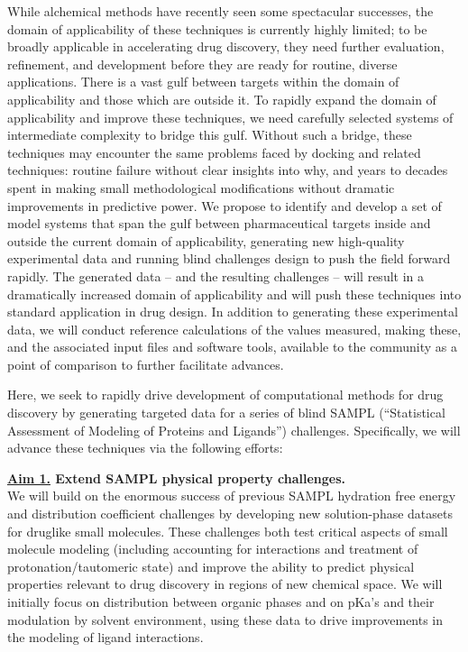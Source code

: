 \documentclass[11pt]{article}
\begin{document}
While alchemical methods have recently seen some spectacular successes, the domain of applicability of these techniques is currently highly limited; to be broadly applicable in accelerating drug discovery, they need further evaluation, refinement, and development before they are ready for routine, diverse applications. 
There is a vast gulf between targets within the domain of applicability and those which are outside it. 
To rapidly expand the domain of applicability and improve these techniques, we need carefully selected systems of intermediate complexity to bridge this gulf. 
Without such a bridge, these techniques may encounter the same problems faced by docking and related techniques: routine failure without clear insights into why, and years to decades spent in making small methodological modifications without dramatic improvements in predictive power.
We propose to identify and develop a set of model systems that span the gulf between pharmaceutical targets inside and outside the current domain of applicability, generating new high-quality experimental data and running blind challenges design to push the field forward rapidly.
The generated data -- and the resulting challenges -- will result in a dramatically increased domain of applicability and will push these techniques into standard application in drug design.
In addition to generating these experimental data, we will conduct reference calculations of the values measured, making these, and the associated input files and software tools, available to the community as a point of comparison to further facilitate advances.


Here, we seek to rapidly drive development of computational methods for drug discovery by generating targeted data for a series of blind SAMPL (``Statistical Assessment of Modeling of Proteins and Ligands'') challenges. Specifically, we will advance these techniques via the following efforts:

{\bf \underline{Aim 1.} Extend SAMPL physical property challenges.}\\
We will build on the enormous success of previous SAMPL hydration free energy and distribution coefficient challenges by developing new solution-phase datasets for druglike small molecules. 
These challenges both test critical aspects of small molecule modeling (including accounting for interactions and treatment of protonation/tautomeric state) and improve the ability to predict physical properties relevant to drug discovery in regions of new chemical space. 
We will initially focus on distribution between organic phases and on pKa's and their modulation by solvent environment, using these data to drive improvements in the modeling of ligand interactions.
\end{document}
